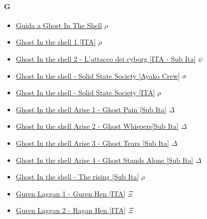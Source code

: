 		\paragraph{G} \hypertarget{FG}{}
			\begin{itemize}
				\item \href{https://mega.nz/#!dFhXBJQT!cXfScy_Ctw0USQNdIYem-pKwphbcsAih_xuAMhkJuoA} {Guida a Ghost In The Shell}  $\rho$   \\
				\item \href{https://mega.nz/#!RQQmGBSb!iKMp2T4P_IPGYKcIH1PqsjeFuvxEF9ykcJxDNv4HODE} {Ghost In the shell 1 [ITA]}  $\rho$   \\
				\item \href{https://mega.nz/#!Ds8TVbYC!9nRI5pDxd3lsILpMCjr7noIhPkB1XV8MMKWF5nb_fMg} {Ghost In the shell 2 - L'attacco dei cyborg [ITA - Sub Ita]}  $\psi$   \\
				\item \href{https://mega.nz/#!cVVkiJ6Q!k1q6gTAVXrnHLKXrBT2hw4qPo-Je40VO5p03Hbqjnlg} {Ghost In the shell - Solid State Society [Ayako Crew]}  $\sigma$   \\
				\item \href{https://mega.nz/#!NNwTQLrD!7qrAOXhBYWoqijNpHccAlB6itxQ_3lbDdJYlU210GeE} {Ghost In the shell - Solid State Society [ITA]}  $\rho$   \\
				\item \href{https://mega.nz/#!l3QBSIZS!HB0CHax6o5mubwu1HnpTJVfWYCrJobelhUKGJiMXJT0} {Ghost In the shell Arise 1 - Ghost Pain [Sub Ita]}  $\varDelta$   \\
				\item \href{https://mega.nz/#!lqIhHIJL!vDlOTjqhjsuGqKiAEi0gFS7jvmpL4S-OX8GYLclWTP8} {Ghost In the shell Arise 2 - Ghost Whispers[Sub Ita]}  $\varDelta$   \\
				\item \href{https://mega.nz/#!M2w2lJiD!JUQW4Dk6l4aADrK1KQuHtZZMIu2PcuLSvTSGlmtfYLY} {Ghost In the shell Arise 3 - Ghost Tears [Sub Ita]}  $\varDelta$   \\
				\item \href{https://mega.nz/#!Z2g1yQ7Q!4w0TwQMpVBN4q1exxA9jze7UFcoW_h3aT2WPJsZC3uY} {Ghost In the shell Arise 4 - Ghost Stands Alone [Sub Ita]}  $\varDelta$   \\
				\item \href{https://mega.nz/#!YBI2FIbI!Siw5Qt_8tZaOKvIH8m-2dLQ_3eBmetycTORvRhIrte0} {Ghost In the shell - The rising [Sub Ita]}  $\rho$   \\
				\item \href{https://mega.nz/#!MGpWSbhQ!fJsTVs4wcdF8NjQ6a2ILF2weNcdb0hN2wmbB96QT-qw} {Guren Laggan 1 - Guren Hen  [ITA]}  $\Xi$   \\
				\item \href{https://mega.nz/#!xWhUgLTJ!sfT-TUR6TSWa0rwwGGjp6KBxjC9b2ax-iJonwrvKA78} {Guren Laggan 2 - Ragan Hen  [ITA]}  $\Xi$   \\
			
			\end{itemize}
		
